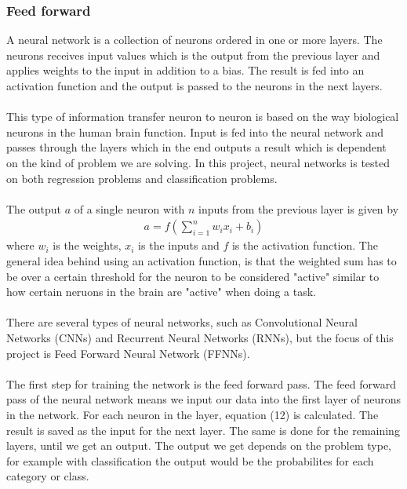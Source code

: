 \documentclass[a4paper,twocolumn]{article}
\begin{document}
\subsubsection{Feed forward}
A neural network is a collection of neurons ordered in one or more layers. The neurons receives input values which is the output from the previous layer and applies weights to the input in addition to a bias. The result is fed into an activation function and the output is passed to the neurons in the next layers. \\
\\
This type of information transfer neuron to neuron is based on the way biological neurons in the human brain function. Input is fed into the neural network and passes through the layers which in the end outputs a result which is dependent on the kind of problem we are solving. In this project, neural networks is tested on both regression problems and classification problems.\\
\\
The output $a$ of a single neuron with $n$ inputs from the previous layer is given by
\begin{align}
    a = f(\sum_{i = 1}^{n}w_{i}x_{i} + b_{i})
\end{align}
where $w_{i}$ is the weights, $x_{i}$ is the inputs and $f$ is the activation function. The general idea behind using an activation function, is that the weighted sum has to be over a certain threshold for the neuron to be considered "active" similar to how certain neruons in the brain are "active" when doing a task.\\
\\
There are several types of neural networks, such as Convolutional Neural Networks (CNNs) and Recurrent Neural Networks (RNNs), but the focus of this project is Feed Forward Neural Network (FFNNs).\\
\\
The first step for training the network is the feed forward pass. The feed forward pass of the neural network means we input our data into the first layer of neurons in the network. For each neuron in the layer, equation (12) is calculated. The result is saved as the input for the next layer. The same is done for the remaining layers, until we get an output. The output we get depends on the problem type, for example with classification the output would be the probabilites for each category or class.
\end{document}
